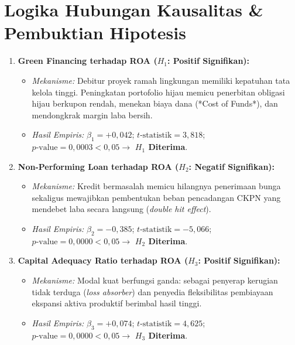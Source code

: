 \documentclass[11pt,a4paper]{article}
\begin{document}
\section{Logika Hubungan Kausalitas \& Pembuktian Hipotesis}

\begin{enumerate}
    \item \textbf{Green Financing terhadap ROA ($H_1$: Positif Signifikan):}
    \begin{itemize}
        \item \textit{Mekanisme:} Debitur proyek ramah lingkungan memiliki kepatuhan tata kelola tinggi. Peningkatan portofolio hijau memicu penerbitan obligasi hijau berkupon rendah, menekan biaya dana (*Cost of Funds*), dan mendongkrak margin laba bersih.
        \item \textit{Hasil Empiris:} $\beta_1 = +0{,}042$; $t\text{-statistik} = 3{,}818$; $p\text{-value} = 0{,}0003 < 0{,}05 \rightarrow$ \textbf{$H_1$ Diterima}.
    \end{itemize}

    \item \textbf{Non-Performing Loan terhadap ROA ($H_2$: Negatif Signifikan):}
    \begin{itemize}
        \item \textit{Mekanisme:} Kredit bermasalah memicu hilangnya penerimaan bunga sekaligus mewajibkan pembentukan beban pencadangan CKPN yang mendebet laba secara langsung (\textit{double hit effect}).
        \item \textit{Hasil Empiris:} $\beta_2 = -0{,}385$; $t\text{-statistik} = -5{,}066$; $p\text{-value} = 0{,}0000 < 0{,}05 \rightarrow$ \textbf{$H_2$ Diterima}.
    \end{itemize}

    \item \textbf{Capital Adequacy Ratio terhadap ROA ($H_3$: Positif Signifikan):}
    \begin{itemize}
        \item \textit{Mekanisme:} Modal kuat berfungsi ganda: sebagai penyerap kerugian tidak terduga (\textit{loss absorber}) dan penyedia fleksibilitas pembiayaan ekspansi aktiva produktif berimbal hasil tinggi.
        \item \textit{Hasil Empiris:} $\beta_3 = +0{,}074$; $t\text{-statistik} = 4{,}625$; $p\text{-value} = 0{,}0000 < 0{,}05 \rightarrow$ \textbf{$H_3$ Diterima}.
    \end{itemize}


\end{enumerate}
\end{document}
